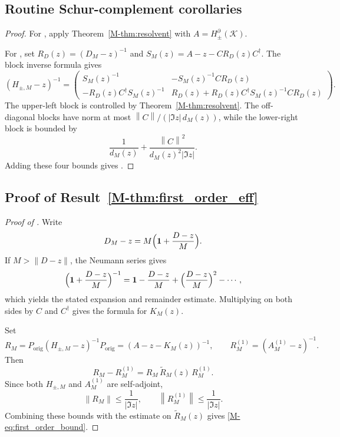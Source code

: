 \documentclass[11pt]{article}
\numberwithin{equation}{section}
\theoremstyle{definition}
\theoremstyle{remark}
\newcommand{\K}{\mathcal{K}}
\newcommand{\bd}{\partial}
\newcommand{\Id}{\mathbf{1}}
\newcommand{\opnorm}[1]{\left\lVert#1\right\rVert}
\begin{document}
\subsection{Routine Schur-complement corollaries}\label{app:proof:schur_routine_corollaries}
\begin{proof}
For , apply Theorem~\ref{M-thm:resolvent} with
\(A=H_{\pm}^{\bd}(\K)\).

For , set \(R_D(z)=(D_M-z)^{-1}\) and
\(S_M(z)=A-z-CR_D(z)C^\dagger\). The block inverse formula gives
\[
(H_{\pm,M}-z)^{-1}=
\begin{pmatrix}
S_M(z)^{-1}&-S_M(z)^{-1}CR_D(z)\\[0.4em]
-R_D(z)C^\dagger S_M(z)^{-1}&R_D(z)+R_D(z)C^\dagger S_M(z)^{-1}CR_D(z)
\end{pmatrix}.
\]
The upper-left block is controlled by Theorem~\ref{M-thm:resolvent}. The off-diagonal blocks have norm
at most \(\opnorm{C}/(|\Im z|\,d_M(z))\), while the lower-right block is bounded by
\[
\frac1{d_M(z)}+\frac{\opnorm{C}^2}{d_M(z)^2|\Im z|}.
\]
Adding these four bounds gives .
\end{proof}

\subsection{Proof of Result~\ref{M-thm:first_order_eff}}\label{app:proof:thm:first_order_eff}
\begin{proof}[Proof of ]
Write
\[
D_M-z=M\Bigl(\Id+\frac{D-z}{M}\Bigr).
\]
If $M>\|D-z\|$, the Neumann series gives
\[
\Bigl(\Id+\frac{D-z}{M}\Bigr)^{-1}
=
\Id-\frac{D-z}{M}+\Bigl(\frac{D-z}{M}\Bigr)^2-\cdots,
\]
which yields the stated expansion and remainder estimate. Multiplying on both sides by $C$ and $C^\dagger$ gives the formula for $K_M(z)$.

Set
\[
R_M=P_{\mathrm{orig}}(H_{\pm,M}-z)^{-1}P_{\mathrm{orig}}=(A-z-K_M(z))^{-1},
\qquad
R_M^{(1)}=(A_M^{(1)}-z)^{-1}.
\]
Then
\[
R_M-R_M^{(1)}=R_M\,\widetilde R_M(z)\,R_M^{(1)}.
\]
Since both $H_{\pm,M}$ and $A_M^{(1)}$ are self-adjoint,
\[
\opnorm{R_M}\le \frac1{|\Im z|},
\qquad
\opnorm{R_M^{(1)}}\le \frac1{|\Im z|}.
\]
Combining these bounds with the estimate on $\widetilde R_M(z)$ gives \eqref{M-eq:first_order_bound}.
\end{proof}
\end{document}
